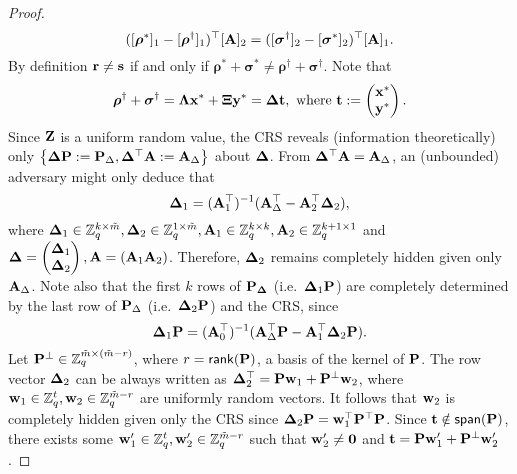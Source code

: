 \begin{proof}
\begin{equation*}
([{\boldsymbol \rho}^{*}]_1-[{\boldsymbol \rho}^{\dagger}]_1)^{\top} [\mathbf{{A}}]_2=  ([{\boldsymbol \sigma}^{\dagger}]_2-[{\boldsymbol \sigma}^{*}]_2)^{\top} [\mathbf{{A}}]_1.
\end{equation*}
By definition $\mathbf{r} \neq \mathbf{s}$  if and only if  $\boldsymbol \rho^{*}+\boldsymbol \sigma^{*} \neq 
\boldsymbol \rho^{\dagger}+ \boldsymbol \sigma^{\dagger}$.
Note that 
\begin{equation*}
\boldsymbol \rho^{\dagger}+ \boldsymbol \sigma^{\dagger}=\mathbf{{\Lambda}}  \mathbf{x}^*+ \mathbf{{\Xi}} \mathbf{y}^*=
\mathbf{{\Delta}} \mathbf{t},\text{ where }\mathbf{t}:=\begin{pmatrix} \mathbf{x}^* \\ \mathbf{y}^* \end{pmatrix}.
\end{equation*}
Since $\mathbf{{Z}}$ is a uniform random value, the CRS reveals (information theoretically) only $\left\{\mathbf{{\Delta}}\mathbf{{P}}:=\mathbf{{P}}_\Delta,  \mathbf{{\Delta}}^{\top}\mathbf{{A}}:=\mathbf{{A}}_\Delta \right\}$ about $\mathbf{{\Delta}}$. From $\mathbf{{\Delta}}^\top \mathbf{{A}} = \mathbf{{A}}_\Delta$, an (unbounded) adversary might only deduce that
$$
\mathbf{{\Delta}}_1 = (\mathbf{{A}}_1^\top)^{-1}(\mathbf{{A}}_\Delta^\top-\mathbf{{A}}_2^\top\mathbf{{\Delta}}_2),
$$
where $\mathbf{{\Delta}}_1\in\mathbb{Z}_q^{k\times \tilde{m}},\mathbf{{\Delta}}_2\in\mathbb{Z}_q^{1\times\tilde{m}},\mathbf{{A}}_1\in\mathbb{Z}_q^{k\times k},\mathbf{{A}}_2\in\mathbb{Z}_q^{k+1\times 1}$ and $\mathbf{{\Delta}}=\left(\begin{matrix}\mathbf{{\Delta}}_1\\\mathbf{{\Delta}}_2\end{matrix}\right),\mathbf{{A}}=(\mathbf{{A}}_1 \mathbf{{A}}_2)$. Therefore, $\mathbf{{\Delta}}_2$ remains completely hidden given only $\mathbf{{A}}_\Delta$. Note also that the first $k$ rows of $\mathbf{{P}}_{\mathbf{{\Delta}}}$ (i.e.~$\mathbf{{\Delta}}_1\mathbf{{P}}$) are completely determined by the last row of $\mathbf{{P}}_\Delta$ (i.e.~$\mathbf{{\Delta}}_2\mathbf{{P}}$) and the CRS, since
$$
\mathbf{{\Delta}}_1\mathbf{{P}}=(\mathbf{{A}}_0^\top)^{-1}(\mathbf{{A}}_\Delta^\top\mathbf{{P}}-\mathbf{{A}}_1^\top\mathbf{{\Delta}}_2\mathbf{{P}}).
$$
Let $\mathbf{{P^\perp}}\in\mathbb{Z}_q^{\tilde{m}\times(\tilde{m}-r)}$, where $r=\mathsf{rank}(\mathbf{{P}})$, a basis of the kernel of $\mathbf{{P}}$.
The row vector $\mathbf{{\Delta}}_2$ can be always written as $\mathbf{{\Delta}}_2^\top=\mathbf{{P}}\mathbf{w}_1+\mathbf{{P}}^\perp\mathbf{w}_2$, where $\mathbf{w}_1\in\mathbb{Z}_q^{t},\mathbf{w}_2\in\mathbb{Z}_q^{\tilde{m}-r}$ are uniformly random vectors. It follows that $\mathbf{w}_2$ is completely hidden given only the CRS since $\mathbf{{\Delta}}_2\mathbf{{P}}=\mathbf{w}_1^\top\mathbf{{P}}^\top\mathbf{{P}}$. Since $\mathbf{t}\notin\mathsf{span}(\mathbf{{P}})$, there exists some $\mathbf{w}'_1\in\mathbb{Z}_q^t,\mathbf{w}'_2\in\mathbb{Z}_q^{\tilde{m}-r}$ such that $\mathbf{w}'_2\neq \mathbf{0}$ and $\mathbf{t} = \mathbf{{P}}\mathbf{w}'_1+\mathbf{{P^\perp}}\mathbf{w}'_2$.

\end{proof}
